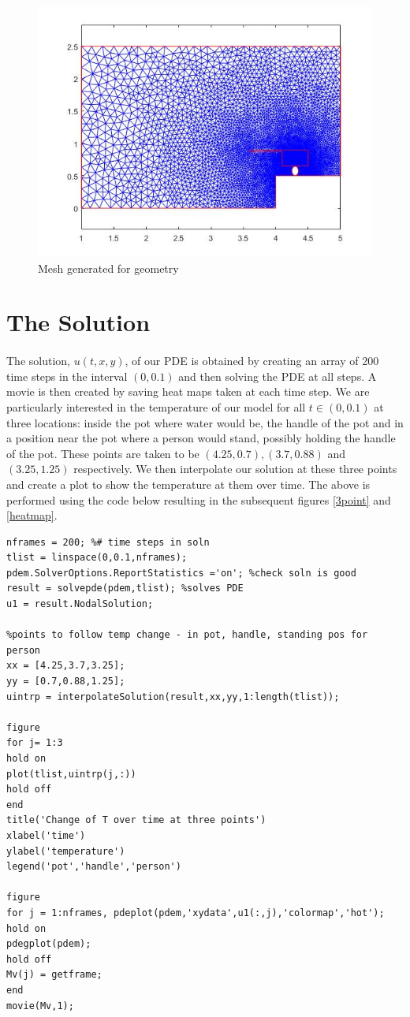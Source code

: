 \documentclass[12pt]{article}  %
\begin{document}
\begin{figure}[H]
	\includegraphics[scale=.75]{mesh}
	\caption{Mesh generated for geometry}
	\label{mesh}
\end{figure}

\section{The Solution}
\paragraph{} The solution, $u(t,x,y)$, of our PDE is obtained by creating an array of 200 time steps in the interval $(0,0.1)$ and then solving the PDE at all steps. A movie is then created by saving heat maps taken at each time step. We are particularly interested in the temperature of our model for all $t\in(0,0.1)$ at three locations: inside the pot where water would be, the handle of the pot and in a position near the pot where a person would stand, possibly holding the handle of the pot. These points are taken to be $(4.25,0.7), (3.7,0.88)$ and $(3.25,1.25)$ respectively. We then interpolate our solution at these three points and create a plot to show the temperature at them over time. The above is performed using the code below resulting in the subsequent figures \ref{3point} and \ref{heatmap}.

\begin{lstlisting}
nframes = 200; %# time steps in soln
tlist = linspace(0,0.1,nframes);
pdem.SolverOptions.ReportStatistics ='on'; %check soln is good
result = solvepde(pdem,tlist); %solves PDE
u1 = result.NodalSolution;

%points to follow temp change - in pot, handle, standing pos for person
xx = [4.25,3.7,3.25];
yy = [0.7,0.88,1.25];
uintrp = interpolateSolution(result,xx,yy,1:length(tlist));

figure
for j= 1:3
hold on
plot(tlist,uintrp(j,:))
hold off
end
title('Change of T over time at three points')
xlabel('time')
ylabel('temperature')
legend('pot','handle','person')

figure 
for j = 1:nframes, pdeplot(pdem,'xydata',u1(:,j),'colormap','hot');
hold on 
pdegplot(pdem);
hold off 
Mv(j) = getframe;
end
movie(Mv,1);

\end{lstlisting}
\end{document}
